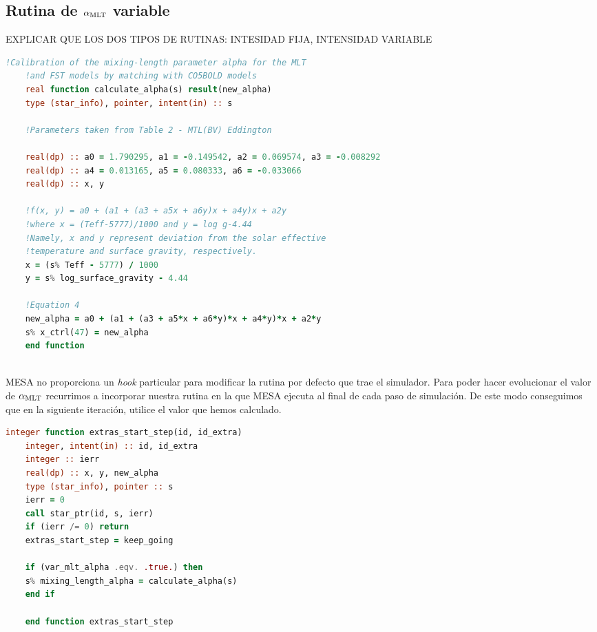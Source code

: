 \subsection{Rutina de $\alpha_{\mathrm{MLT}}$ variable}
EXPLICAR QUE LOS DOS TIPOS DE RUTINAS: INTESIDAD FIJA, INTENSIDAD VARIABLE
\begin{lstlisting}[language=Fortran, caption={Rutina de $\amlt$ variable.}, label={lst:var_amlt}]
	!Calibration of the mixing-length parameter alpha for the MLT
	!and FST models by matching with CO5BOLD models
	real function calculate_alpha(s) result(new_alpha)
	type (star_info), pointer, intent(in) :: s
	
	!Parameters taken from Table 2 - MTL(BV) Eddington
	
	real(dp) :: a0 = 1.790295, a1 = -0.149542, a2 = 0.069574, a3 = -0.008292
	real(dp) :: a4 = 0.013165, a5 = 0.080333, a6 = -0.033066
	real(dp) :: x, y
	
	!f(x, y) = a0 + (a1 + (a3 + a5x + a6y)x + a4y)x + a2y
	!where x = (Teff-5777)/1000 and y = log g-4.44
	!Namely, x and y represent deviation from the solar effective 
	!temperature and surface gravity, respectively.
	x = (s% Teff - 5777) / 1000
	y = s% log_surface_gravity - 4.44
	
	!Equation 4
	new_alpha = a0 + (a1 + (a3 + a5*x + a6*y)*x + a4*y)*x + a2*y
	s% x_ctrl(47) = new_alpha
	end function
	
\end{lstlisting}

MESA no proporciona un \textit{hook} particular para modificar la rutina por defecto que trae el simulador. Para poder hacer evolucionar el valor de $\alpha_{\mathrm{MLT}}$ recurrimos a incorporar nuestra rutina en la que MESA ejecuta al final de cada paso de simulación. De este modo conseguimos que en la siguiente iteración, utilice el valor que hemos calculado.
\begin{lstlisting}[language=Fortran, caption={Rutina de MESA para ejecutar lógica adicional tras la ejecución de un paso de simulación.}, label={lst:extra_start_step}]
	integer function extras_start_step(id, id_extra)
	integer, intent(in) :: id, id_extra
	integer :: ierr
	real(dp) :: x, y, new_alpha
	type (star_info), pointer :: s
	ierr = 0
	call star_ptr(id, s, ierr)
	if (ierr /= 0) return
	extras_start_step = keep_going
	
	if (var_mlt_alpha .eqv. .true.) then
	s% mixing_length_alpha = calculate_alpha(s)
	end if
	
	end function extras_start_step
\end{lstlisting}

\endinput

